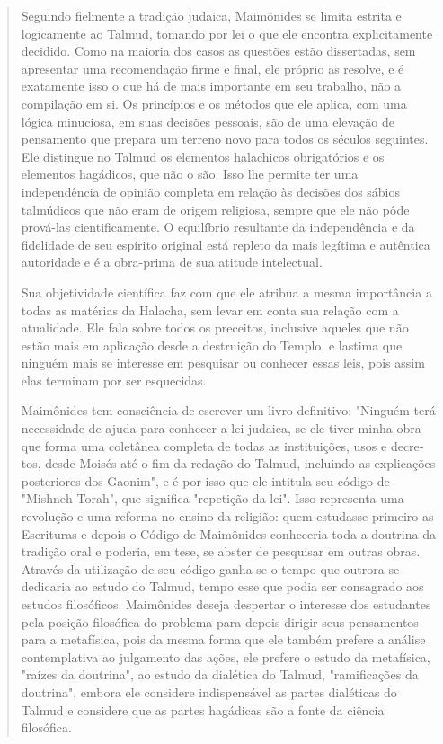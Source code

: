 \begin{quote}
Seguindo fielmente a tradição judaica, Maimônides se limita estrita e
logicamente ao Talmud, tomando por lei o que ele encontra explicitamente
decidido. Como na maioria dos casos as questões estão dissertadas, sem
apre­sentar uma recomendação firme e final, ele próprio as resolve, e é
exatamente isso o que há de mais importante em seu trabalho, não a
compilação em si. Os princípios e os métodos que ele aplica, com uma
lógica minuciosa, em suas de­cisões pessoais, são de uma elevação de
pensamento que prepara um terreno novo para todos os séculos seguintes.
Ele distingue no Talmud os elementos halachicos obrigatórios e os
elementos hagádicos, que não o são. Isso lhe per­mite ter uma
independência de opinião completa em relação às decisões dos sábios
talmúdicos que não eram de origem religiosa, sempre que ele não pôde
prová-las cientificamente. O equilíbrio resultante da independência e da
fideli­dade de seu espírito original está repleto da mais legítima e
autêntica autorida­de e é a obra-prima de sua atitude intelectual.

Sua objetividade científica faz com que ele atribua a mesma impor­tância
a todas as matérias da Halacha, sem levar em conta sua relação com a
atualidade. Ele fala sobre todos os preceitos, inclusive aqueles que não
estão mais em aplicação desde a destruição do Templo, e lastima que
ninguém mais se interesse em pesquisar ou conhecer essas leis, pois
assim elas terminam por ser esquecidas.

Maimônides tem consciência de escrever um livro definitivo: "Nin­guém
terá necessidade de ajuda para conhecer a lei judaica, se ele tiver
minha obra que forma uma coletânea completa de todas as instituições,
usos e decre­tos, desde Moisés até o fim da redação do Talmud, incluindo
as explicações posteriores dos Gaonim", e é por isso que ele intitula
seu código de "Mishneh Torah", que significa "repetição da lei". Isso
representa uma revolução e uma reforma no ensino da religião: quem
estudasse primeiro as Escrituras e depois o Código de Maimônides
conheceria toda a doutrina da tradição oral e poderia, em tese, se
abster de pesquisar em outras obras. Através da utilização de seu código
ganha-se o tempo que outrora se dedicaria ao estudo do Talmud, tem­po
esse que podia ser consagrado aos estudos filosóficos. Maimônides deseja
despertar o interesse dos estudantes pela posição filosófica do problema
para depois dirigir seus pensamentos para a metafísica, pois da mesma
forma que ele também prefere a análise contemplativa ao julgamento das
ações, ele prefe­re o estudo da metafísica, "raízes da doutrina", ao
estudo da dialética do Tal­mud, "ramificações da doutrina", embora ele
considere indispensável as par­tes dialéticas do Talmud e considere que
as partes hagádicas são a fonte da ciência filosófica.
\end{quote}

